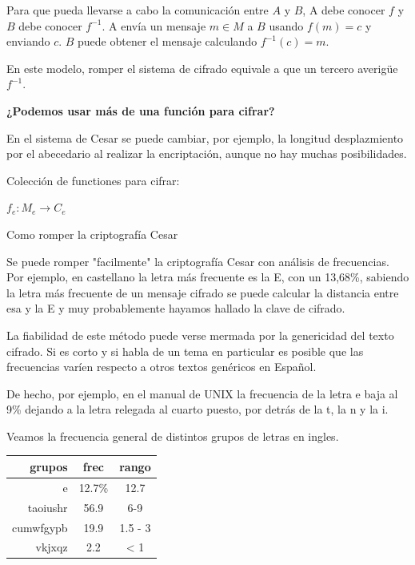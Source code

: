 		Para que pueda llevarse a cabo la comunicación entre $A$ y $B$, A debe conocer $f$ y $B$ debe conocer $f^{-1}$. A envía un mensaje $m\in M$ a $B$ usando $f(m)=c$ y enviando $c$. $B$ puede obtener el mensaje calculando $f^{-1}(c) = m$.

		En este modelo, romper el sistema de cifrado equivale a que un tercero averigüe $f^{-1}$.


		\textbf{¿Podemos usar más de una función para cifrar?}

		En el sistema de Cesar se puede cambiar, por ejemplo, la longitud desplazmiento por el abecedario al realizar la encriptación, aunque no hay muchas posibilidades.

		\begin{defn}[Criptosistema]
			Colección de functiones para cifrar:

			$f_e : M_e \rightarrow C_e$

		\end{defn}


		\vspace{1.5cm}

		\begin{example}{Como romper la criptografía Cesar}

			Se puede romper "facilmente" la criptografía Cesar con análisis de frecuencias. Por ejemplo, en castellano la letra más frecuente es la E, con un 13,68\%, sabiendo la letra más frecuente de un mensaje cifrado se puede calcular la distancia entre esa y la E y muy probablemente hayamos hallado la clave de cifrado.

			La fiabilidad de este método puede verse mermada por la genericidad del texto cifrado. Si es corto y si habla de un tema en particular es posible que las frecuencias varíen respecto a otros textos genéricos en Español.

			De hecho, por ejemplo, en el manual de UNIX la frecuencia de la letra e baja al 9\% dejando a la letra relegada al cuarto puesto, por detrás de la t, la n y la i.

		\end{example}


		Veamos la frecuencia general de distintos grupos de letras en ingles.

		\begin{tabular}[h]{r|c|c}
			\textbf{grupos} & \textbf{frec} & \textbf{rango} \\ \hline
			e & 12.7\% & 12.7 \\
			taoiushr & 56.9 & 6-9 \\
			cumwfgypb & 19.9 & 1.5 - 3 \\
			vkjxqz & 2.2 & < 1
		\end{tabular}

